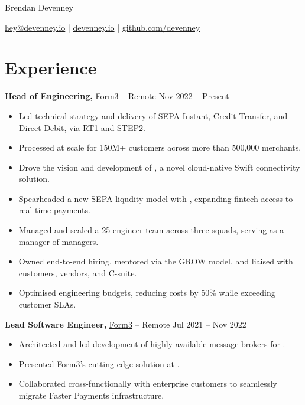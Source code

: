 \documentclass[11pt]{article}       %
\begin{document}
\centerline{\Huge Brendan Devenney}

\vspace{5pt}

\centerline{\href{mailto:hey@devenney.io}{hey@devenney.io} | \href{https://devenney.io}{devenney.io} | \href{https://github.com/devenney}{github.com/devenney}}

\vspace{-10pt}

\section*{Experience}

\textbf{Head of Engineering,} \href{https://form3.tech/}{Form3} -- Remote \hfill Nov 2022 -- Present \\
\vspace{-9pt}
\begin{itemize}
  \item Led technical strategy and delivery of SEPA Instant, Credit Transfer, and Direct Debit, via RT1 and STEP2. \\
  \item Processed  at scale for 150M+ customers across more than 500,000 merchants. \\
  \item Drove the vision and development of , a novel cloud-native Swift connectivity solution. \\
  \item Spearheaded a new SEPA liqudity model with , expanding fintech access to real-time payments. \\
  \item Managed and scaled a 25-engineer team across three squads, serving as a manager-of-managers. \\
  \item Owned end-to-end hiring, mentored via the GROW model, and liaised with customers, vendors, and C-suite. \\
  \item Optimised engineering budgets, reducing costs by 50\% while exceeding customer SLAs. \\
\end{itemize}

\textbf{Lead Software Engineer,} \href{https://form.tech/}{Form3} -- Remote \hfill Jul 2021 -- Nov 2022 \\
\vspace{-9pt}
\begin{itemize}
  \item Architected and led development of highly available message brokers for . \\
  \item Presented Form3's cutting edge solution at . \\
  \item Collaborated cross-functionally with enterprise customers to seamlessly migrate Faster Payments infrastructure. \\
\end{itemize}
\end{document}
